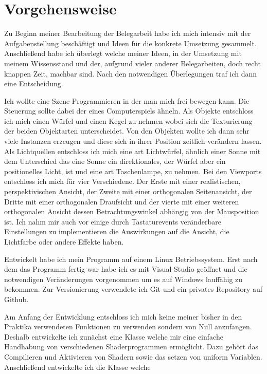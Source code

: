 \documentclass{article}
\begin{document}
\section{Vorgehensweise}\label{Vorgehensweise}
Zu Beginn meiner Bearbeitung der Belegarbeit habe ich mich intensiv mit der Aufgabenstellung beschäftigt und Ideen
für die konkrete Umsetzung gesammelt. Anschließend habe ich überlegt welche meiner Ideen, in der Umsetzung mit meinem
Wissensstand und der, aufgrund vieler anderer Belegarbeiten, doch recht knappen Zeit, machbar sind.
Nach den notwendigen Überlegungen traf ich dann eine Entscheidung.\par
\medskip
Ich wollte eine Szene Programmieren in der man mich frei bewegen kann. Die Steuerung sollte dabei der eines
Computerspiels ähneln. Als Objekte entschloss ich mich einen Würfel und einen Kegel zu nehmen wobei sich die
Texturierung der beiden Objektarten unterscheidet. Von den Objekten wollte ich dann sehr viele Instanzen erzeugen und diese
sich in ihrer Position zeitlich verändern lassen. Als Lichtquellen entschloss ich mich eine art Lichtwürfel, ähnlich einer
Sonne mit dem Unterschied das eine Sonne ein direktionales, der Würfel aber ein positionelles Licht, ist und eine
art Taschenlampe, zu nehmen. Bei den Viewports entschloss ich mich für vier Verschiedene. Der Erste mit einer realistischen, 
perspektivischen Ansicht, der Zweite mit einer orthogonalen Seitenansicht, der Dritte mit einer orthogonalen
Draufsicht und der vierte mit einer weiteren orthogonalen Ansicht dessen Betrachtungswinkel abhängig von der Mausposition ist.
Ich nahm mir auch vor einige durch Tastaturevents veränderbare Einstellungen zu implementieren die Auswirkungen auf die
Ansicht, die Lichtfarbe oder andere Effekte haben.\par
\medskip
Entwickelt habe ich mein Programm auf einem Linux Betriebssystem. Erst nach dem das Programm fertig war habe ich es
mit Visual-Studio geöffnet und die notwendigen Veränderungen vorgenommen um es auf Windows lauffähig zu bekommen.
Zur Versionierung verwendete ich Git und ein privates Repository auf Github.\par
\medskip
Am Anfang der Entwicklung entschloss ich mich keine meiner bisher in den Praktika verwendeten Funktionen zu verwenden
sondern von Null anzufangen. Deshalb entwickelte ich zunächst eine Klasse  welche mir eine einfache
Handhabung von verschiedenen Shaderprogrammen ermöglicht. Dazu gehört das Compilieren und
Aktivieren von Shadern sowie das setzen von uniform Variablen. Anschließend entwickelte ich die Klasse  welche
\end{document}
